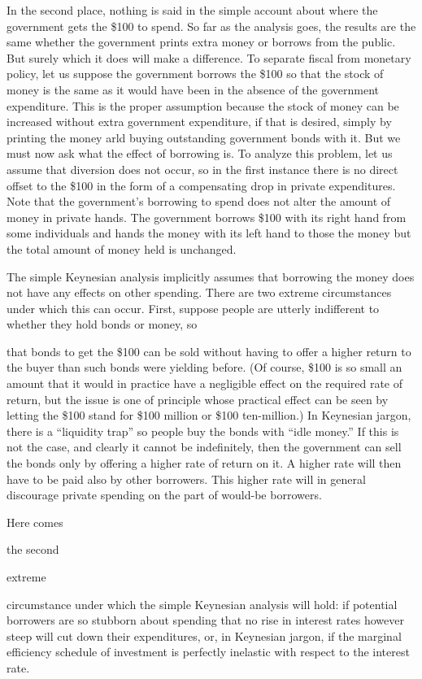 \documentclass[11pt,openany]{book}
\begin{document}
In the second place, nothing is said in the simple account about where the government gets the \$100 to spend. So far as the analysis goes, the results are the same whether the government prints extra money or borrows from the public. But surely which it does will make a difference. To separate fiscal from monetary policy, let us suppose the government borrows the \$100 so that the stock of money is the same as it would have been in the absence of the government expenditure. This is the proper assumption because the stock of money can be increased without extra government expenditure, if that is desired, simply by printing the money arld buying outstanding government bonds with it. But we must now ask what the effect of borrowing is. To analyze this problem, let us assume that diversion does not occur, so in the first instance there is no direct offset to the \$100 in the form of a compensating drop in private expenditures. Note that the government's borrowing to spend does not alter the amount of money in private hands. The government borrows \$100 with its right hand from some individuals and hands the money with its left hand to those the money but the total amount of money held is unchanged.

The simple Keynesian analysis implicitly assumes that borrowing the money does not have any effects on other spending. There are two extreme circumstances under which this can occur. First, suppose people are utterly indifferent to whether they hold bonds or money, so

that bonds to get the \$100 can be sold without having to offer a higher return to the buyer than such bonds were yielding before. (Of course, \$100 is so small an amount that it would in practice have a negligible effect on the required rate of return, but the issue is one of principle whose practical effect can be seen by letting the \$100 stand for \$100 million or \$100 ten-million.) In Keynesian jargon, there is a ``liquidity trap'' so people buy the bonds with ``idle money.'' If this is not the case, and clearly it cannot be indefinitely, then the government can sell the bonds only by offering a higher rate of return on it. A higher rate will then have to be paid also by other borrowers. This higher rate will in general discourage private spending on the part of would-be borrowers.

Here comes

the second

extreme

circumstance under which the simple Keynesian analysis will hold: if potential borrowers are so stubborn about spending that no rise in interest rates however steep will cut down their expenditures, or, in Keynesian jargon, if the marginal efficiency schedule of investment is perfectly inelastic with respect to the interest rate.
\end{document}
